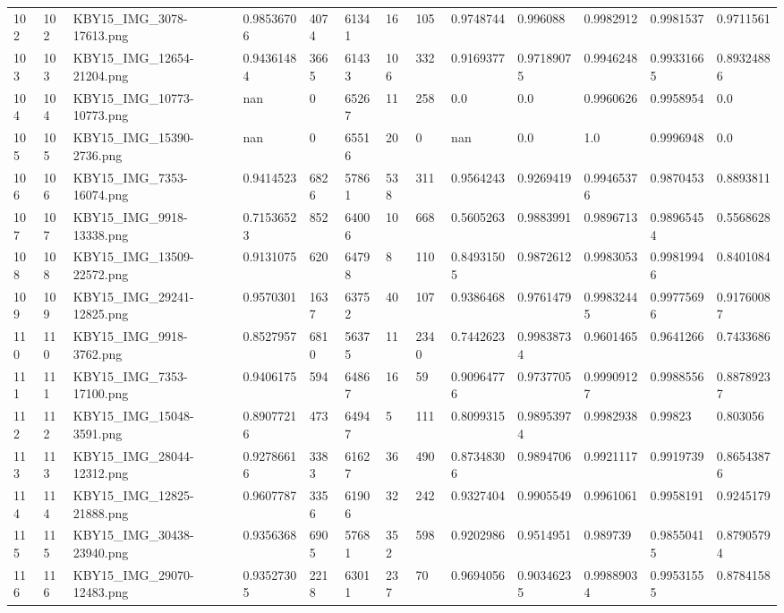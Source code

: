 \documentclass[11pt, a4paper, twoside]{report}
\begin{document}
\begin{longtable}[c]{@{}lllllllllllll@{}}
102 & 102 & KBY15\_IMG\_3078-17613.png & 0.98536706 & 4074 & 61341 & 16 & 105 & 0.9748744 & 0.996088 & 0.9982912 & 0.9981537 & 0.9711561 \\
103 & 103 & KBY15\_IMG\_12654-21204.png & 0.94361484 & 3665 & 61433 & 106 & 332 & 0.9169377 & 0.97189075 & 0.9946248 & 0.99331665 & 0.89324886 \\
104 & 104 & KBY15\_IMG\_10773-10773.png & nan & 0 & 65267 & 11 & 258 & 0.0 & 0.0 & 0.9960626 & 0.9958954 & 0.0 \\
105 & 105 & KBY15\_IMG\_15390-2736.png & nan & 0 & 65516 & 20 & 0 & nan & 0.0 & 1.0 & 0.9996948 & 0.0 \\
106 & 106 & KBY15\_IMG\_7353-16074.png & 0.9414523 & 6826 & 57861 & 538 & 311 & 0.9564243 & 0.9269419 & 0.99465376 & 0.9870453 & 0.8893811 \\
107 & 107 & KBY15\_IMG\_9918-13338.png & 0.71536523 & 852 & 64006 & 10 & 668 & 0.5605263 & 0.9883991 & 0.9896713 & 0.98965454 & 0.5568628 \\
108 & 108 & KBY15\_IMG\_13509-22572.png & 0.9131075 & 620 & 64798 & 8 & 110 & 0.84931505 & 0.9872612 & 0.9983053 & 0.99819946 & 0.8401084 \\
109 & 109 & KBY15\_IMG\_29241-12825.png & 0.9570301 & 1637 & 63752 & 40 & 107 & 0.9386468 & 0.9761479 & 0.99832445 & 0.99775696 & 0.91760087 \\
110 & 110 & KBY15\_IMG\_9918-3762.png & 0.8527957 & 6810 & 56375 & 11 & 2340 & 0.7442623 & 0.99838734 & 0.9601465 & 0.9641266 & 0.7433686 \\
111 & 111 & KBY15\_IMG\_7353-17100.png & 0.9406175 & 594 & 64867 & 16 & 59 & 0.90964776 & 0.9737705 & 0.99909127 & 0.9988556 & 0.88789237 \\
112 & 112 & KBY15\_IMG\_15048-3591.png & 0.89077216 & 473 & 64947 & 5 & 111 & 0.8099315 & 0.98953974 & 0.9982938 & 0.99823 & 0.803056 \\
113 & 113 & KBY15\_IMG\_28044-12312.png & 0.92786616 & 3383 & 61627 & 36 & 490 & 0.87348306 & 0.9894706 & 0.9921117 & 0.9919739 & 0.86543876 \\
114 & 114 & KBY15\_IMG\_12825-21888.png & 0.9607787 & 3356 & 61906 & 32 & 242 & 0.9327404 & 0.9905549 & 0.9961061 & 0.9958191 & 0.9245179 \\
115 & 115 & KBY15\_IMG\_30438-23940.png & 0.9356368 & 6905 & 57681 & 352 & 598 & 0.9202986 & 0.9514951 & 0.989739 & 0.98550415 & 0.87905794 \\
116 & 116 & KBY15\_IMG\_29070-12483.png & 0.93527305 & 2218 & 63011 & 237 & 70 & 0.9694056 & 0.90346235 & 0.99889034 & 0.99531555 & 0.8784158 \\

\end{longtable}
\end{document}
